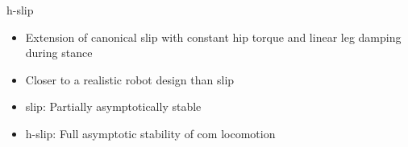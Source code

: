\begin{frame}{\acrfull{h-slip}}%
            \begin{itemize}
                \item Extension of canonical \acrfull{slip} with constant hip torque and linear leg damping during stance
                \item Closer to a realistic robot design than \acrshort{slip}%
                \item \acrshort{slip}: Partially asymptotically stable~\cite{Seyfarth2002} %
                \item \acrshort{h-slip}: Full asymptotic stability of \acrshort{com} locomotion~\cite{Shen2012}
            \end{itemize}%
\end{frame}%
%
%
%